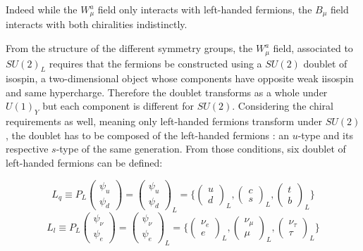 Indeed while the $W_{\mu}^a$ field only interacts with left-handed fermions, the $B_{\mu}$ field interacts with both chiralities indistinctly.

From the structure of the different symmetry groups, the $W_{\mu}^a$ field, associated to $SU(2)_L$ requires that the fermions be constructed using a $SU(2)$ doublet of isospin, a two-dimensional object whose components have opposite weak iisospin and same hypercharge. Therefore the doublet transforms as a whole under $U(1)_Y$ but each component is different for $SU(2)$. Considering the chiral requirements as well, meaning only left-handed fermions transform under $SU(2)$, the doublet has to be composed of the left-handed fermions : an $u$-type and its respective $s$-type of the same generation. From those conditions, six doublet of left-handed fermions can be defined:

\begin{equation}
    L_q \equiv P_L \begin{pmatrix} \psi_u \\ \psi_d \end{pmatrix} = \begin{pmatrix} \psi_u \\ \psi_d \end{pmatrix}_L = \Bigg\{ \begin{pmatrix} u \\ d \end{pmatrix}_L , \begin{pmatrix} c \\ s \end{pmatrix}_L , \begin{pmatrix} t \\ b \end{pmatrix}_L \Bigg\} 
\end{equation}
\begin{equation}
    L_l \equiv P_L \begin{pmatrix} \psi_{\nu} \\ \psi_e \end{pmatrix} = \begin{pmatrix} \psi_{\nu} \\ \psi_e \end{pmatrix}_L = \Bigg\{ \begin{pmatrix} \nu_e \\ e \end{pmatrix}_L , \begin{pmatrix} \nu_{\mu} \\ \mu \end{pmatrix}_L , \begin{pmatrix} \nu_{\tau} \\ \tau \end{pmatrix}_L \Bigg\} 
\end{equation}

